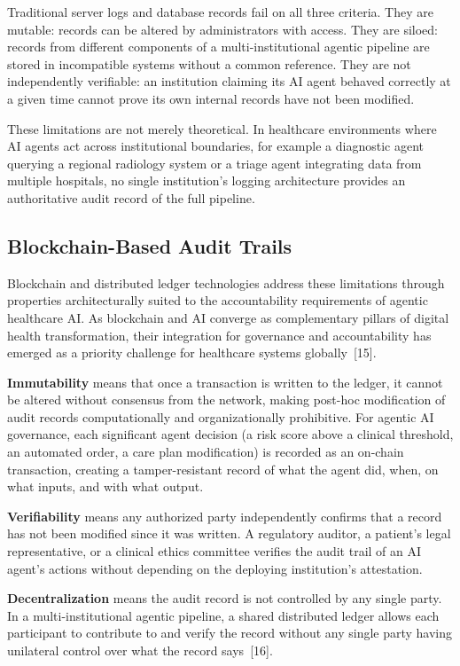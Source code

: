 Traditional server logs and database records fail on all three criteria.
They are mutable: records can be altered by administrators with access.
They are siloed: records from different components of a
multi-institutional agentic pipeline are stored in incompatible systems
without a common reference. They are not independently verifiable: an
institution claiming its AI agent behaved correctly at a given time
cannot prove its own internal records have not been modified.

These limitations are not merely theoretical. In healthcare environments
where AI agents act across institutional boundaries, for example a
diagnostic agent querying a regional radiology system or a triage agent
integrating data from multiple hospitals, no single institution's
logging architecture provides an authoritative audit record of the full
pipeline.

\subsection{Blockchain-Based Audit
Trails}\label{blockchain-based-audit-trails}

Blockchain and distributed ledger technologies address these limitations
through properties architecturally suited to the accountability
requirements of agentic healthcare AI. As blockchain and AI converge as
complementary pillars of digital health transformation, their
integration for governance and accountability has emerged as a priority
challenge for healthcare systems globally~{[}15{]}.

\textbf{Immutability} means that once a transaction is written to the
ledger, it cannot be altered without consensus from the network, making
post-hoc modification of audit records computationally and
organizationally prohibitive. For agentic AI governance, each
significant agent decision (a risk score above a clinical threshold, an
automated order, a care plan modification) is recorded as an on-chain
transaction, creating a tamper-resistant record of what the agent did,
when, on what inputs, and with what output.

\textbf{Verifiability} means any authorized party independently confirms
that a record has not been modified since it was written. A regulatory
auditor, a patient's legal representative, or a clinical ethics
committee verifies the audit trail of an AI agent's actions without
depending on the deploying institution's attestation.

\textbf{Decentralization} means the audit record is not controlled by
any single party. In a multi-institutional agentic pipeline, a shared
distributed ledger allows each participant to contribute to and verify
the record without any single party having unilateral control over what
the record says~{[}16{]}.

